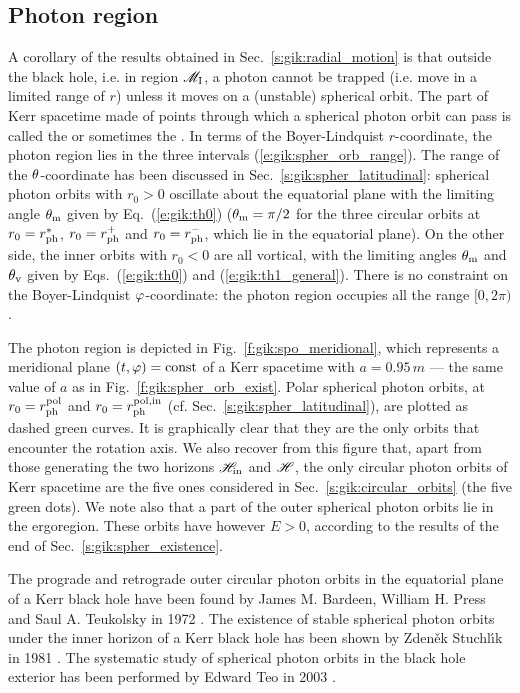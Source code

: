 \subsection{Photon region} \label{s:gik:photon_region}

A corollary of the results obtained in Sec.~\ref{s:gik:radial_motion}
is that outside the black hole, i.e. in region $\mathscr{M}_{\rm I}$, a photon
cannot be trapped (i.e. move in a limited range of $r$) unless it moves
on a (unstable) spherical orbit. The part of Kerr spacetime made of points
through which a spherical photon orbit can pass is called the
 or sometimes the  \cite{Johns_al20}. In terms of the Boyer-Lindquist $r$-coordinate, the photon region
lies in the three intervals (\ref{e:gik:spher_orb_range}).
The range of the $\theta$-coordinate has been discussed in Sec.~\ref{s:gik:spher_latitudinal}:
spherical photon orbits with $r_0 > 0$ oscillate about the equatorial plane
with the limiting angle $\theta_{\rm m}$ given by Eq.~(\ref{e:gik:th0}) ($\theta_{\rm m}=\pi/2$
for the three circular orbits at $r_0 = r_{\rm ph}^*$, $r_0=r_{\rm ph}^+$
and $r_0 = r_{\rm ph}^-$, which lie in the equatorial plane). On the other side,
the inner orbits with $r_0 < 0$ are all vortical, with the limiting
angles $\theta_{\rm m}$ and $\theta_{\rm v}$ given by Eqs.~(\ref{e:gik:th0}) and (\ref{e:gik:th1_general}).
There is no constraint on the Boyer-Lindquist $\varphi$-coordinate: the photon region occupies
all the range $[0, 2\pi)$.

The photon region is depicted in Fig.~\ref{f:gik:spo_meridional}, which represents
a meridional plane $(t,\varphi) = \mathrm{const}$ of a Kerr spacetime with $a=0.95\, m$
--- the same value of $a$ as in Fig.~\ref{f:gik:spher_orb_exist}.
Polar spherical photon orbits, at $r_0 = r_{\rm ph}^{\rm pol}$ and $r_0 = r_{\rm ph}^{\rm pol,in}$
(cf. Sec.~\ref{s:gik:spher_latitudinal}), are plotted as dashed green curves.
It is graphically clear that they are the only orbits that encounter the rotation axis.
We also recover from this figure that, apart from those generating the two horizons $\mathscr{H}_{\rm in}$
and $\mathscr{H}$, the only circular photon orbits of Kerr spacetime are the
five ones considered in Sec.~\ref{s:gik:circular_orbits} (the five green dots).
We note also that a part of the outer spherical photon orbits lie in the ergoregion. These orbits
have however $E>0$, according to the results of the end of Sec.~\ref{s:gik:spher_existence}.

\begin{hist}
The prograde and retrograde outer circular photon orbits in the equatorial plane
of a Kerr black hole have been found by James M. Bardeen, William H. Press and Saul A. Teukolsky in 1972 \cite{BardePT72}.
The existence of stable spherical photon orbits under the inner horizon
of a Kerr black hole has been shown by Zden\v{e}k Stuchl\'{\i}k
in 1981 \cite{Stuch81}. The systematic study of spherical photon orbits
in the black hole exterior has been performed by Edward Teo in 2003 \cite{Teo03}.
\end{hist}



